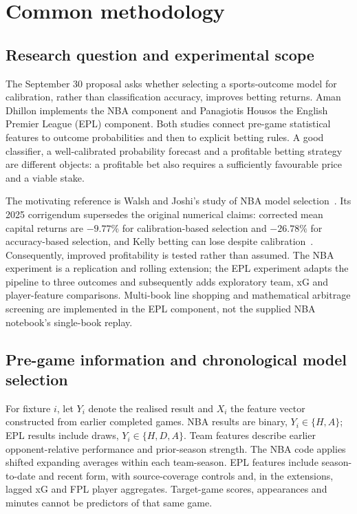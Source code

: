 \section{Common methodology}
\label{sec:common_methodology}

\subsection{Research question and experimental scope}
The September 30 proposal asks whether selecting a sports-outcome model for
calibration, rather than classification accuracy, improves betting returns.
Aman Dhillon implements the NBA component and Panagiotis Housos the English
Premier League (EPL) component. Both studies connect pre-game statistical
features to outcome probabilities and then to explicit betting rules. A good
classifier, a well-calibrated probability forecast and a profitable betting
strategy are different objects: a profitable bet also requires a sufficiently
favourable price and a viable stake.

The motivating reference is Walsh and Joshi's study of NBA model
selection~\cite{walsh2024}. Its 2025 corrigendum supersedes the original
numerical claims: corrected mean capital returns are $-9.77\%$ for
calibration-based selection and $-26.78\%$ for accuracy-based selection, and
Kelly betting can lose despite calibration~\cite{walsh2025corrigendum}.
Consequently, improved profitability is tested rather than assumed. The NBA
experiment is a replication and rolling extension; the EPL experiment adapts
the pipeline to three outcomes and subsequently adds exploratory team, xG and
player-feature comparisons. Multi-book line shopping and mathematical
arbitrage screening are implemented in the EPL component, not the supplied
NBA notebook's single-book replay.

\subsection{Pre-game information and chronological model selection}
For fixture $i$, let $Y_i$ denote the realised result and $X_i$ the feature
vector constructed from earlier completed games. NBA results are binary,
$Y_i\in\{H,A\}$; EPL results include draws,
$Y_i\in\{H,D,A\}$. Team features describe earlier opponent-relative performance
and prior-season strength. The NBA code applies shifted expanding averages
within each team-season. EPL features include season-to-date and recent form,
with source-coverage controls and, in the extensions, lagged xG and FPL player
aggregates. Target-game scores, appearances and minutes cannot be predictors
of that same game.


